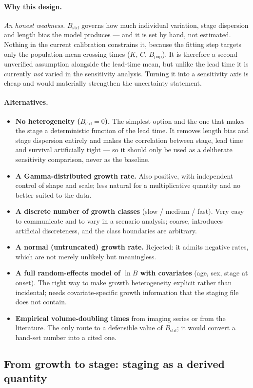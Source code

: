 \documentclass[12pt,a4paper]{article}
\newcommand{\why}[1]{\paragraph{Why this design.} #1}
\newcommand{\alt}[1]{\paragraph{Alternatives.} #1}
\begin{document}
\why{\emph{An honest weakness.} $B_{\text{std}}$ governs how much individual variation, stage dispersion
and length bias the model produces --- and it is set by hand, not estimated. Nothing in the current
calibration constrains it, because the fitting step targets only the population-mean crossing times
($K$, $C$, $B_{\text{pop}}$). It is therefore a second unverified assumption alongside the lead-time mean,
but unlike the lead time it is currently \emph{not} varied in the sensitivity analysis. Turning it into a
sensitivity axis is cheap and would materially strengthen the uncertainty statement.}

\alt{\begin{itemize}[nosep]
  \item \textbf{No heterogeneity ($B_{\text{std}} = 0$).} The simplest option and the one that makes the
        stage a deterministic function of the lead time. It removes length bias and stage dispersion
        entirely and makes the correlation between stage, lead time and survival artificially tight ---
        so it should only be used as a deliberate sensitivity comparison, never as the baseline.
  \item \textbf{A Gamma-distributed growth rate.} Also positive, with independent control of shape and
        scale; less natural for a multiplicative quantity and no better suited to the data.
  \item \textbf{A discrete number of growth classes} (slow / medium / fast). Very easy to communicate and
        to vary in a scenario analysis; coarse, introduces artificial discreteness, and the class
        boundaries are arbitrary.
  \item \textbf{A normal (untruncated) growth rate.} Rejected: it admits negative rates, which are not
        merely unlikely but meaningless.
  \item \textbf{A full random-effects model of $\ln B$ with covariates} (age, sex, stage at onset). The
        right way to make growth heterogeneity explicit rather than incidental; needs covariate-specific
        growth information that the staging file does not contain.
  \item \textbf{Empirical volume-doubling times} from imaging series or from the literature. The only
        route to a defensible value of $B_{\text{std}}$; it would convert a hand-set number into a cited
        one.
\end{itemize}}

\subsection{From growth to stage: staging as a derived quantity}
\label{sec:stage}
\end{document}
